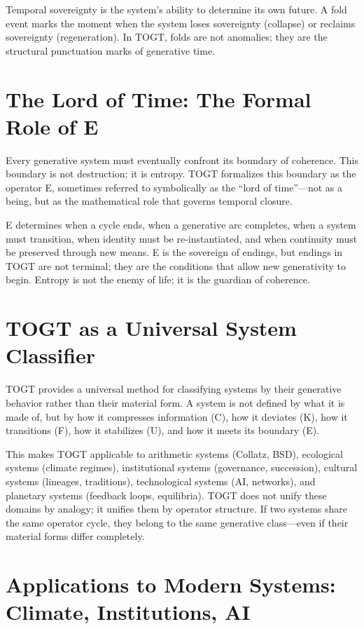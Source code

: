 \documentclass[14pt, twoside, openright]{book}
\theoremstyle{definition}
\theoremstyle{remark}
\begin{document}
Temporal sovereignty is the system's ability to determine its own future.
A fold event marks the moment when the system loses sovereignty (collapse) or
reclaims sovereignty (regeneration). In TOGT, folds are not anomalies; they are
the structural punctuation marks of generative time.

\section{The Lord of Time: The Formal Role of E}

Every generative system must eventually confront its boundary of coherence. This
boundary is not destruction; it is entropy. TOGT formalizes this boundary as the
operator E, sometimes referred to symbolically as the ``lord of time''---not as
a being, but as the mathematical role that governs temporal closure.

E determines when a cycle ends, when a generative arc completes, when a system
must transition, when identity must be re-instantiated, and when continuity must
be preserved through new means. E is the sovereign of endings, but endings in
TOGT are not terminal; they are the conditions that allow new generativity to
begin. Entropy is not the enemy of life; it is the guardian of coherence.

\section{TOGT as a Universal System Classifier}

TOGT provides a universal method for classifying systems by their generative
behavior rather than their material form. A system is not defined by what it is
made of, but by how it compresses information (C), how it deviates (K), how it
transitions (F), how it stabilizes (U), and how it meets its boundary (E).

This makes TOGT applicable to arithmetic systems (Collatz, BSD), ecological
systems (climate regimes), institutional systems (governance, succession),
cultural systems (lineages, traditions), technological systems (AI, networks),
and planetary systems (feedback loops, equilibria). TOGT does not unify these
domains by analogy; it unifies them by operator structure. If two systems share
the same operator cycle, they belong to the same generative class---even if their
material forms differ completely.

\section{Applications to Modern Systems: Climate, Institutions, AI}
\end{document}
